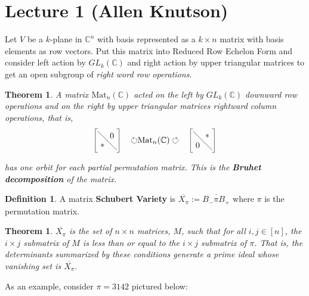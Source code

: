 \documentclass[12pt]{amsart}
\numberwithin{equation}{section}
\newtheorem{Theorem}[equation]{Theorem}
\theoremstyle{definition}
\newtheorem{Definition}[equation]{Definition}
\numberwithin{figure}{section}
\newcommand{\C}{\mathbb{C}}
\begin{document}
\section{Lecture 1 (Allen Knutson)}

Let $V$ be a $k$-plane in $\C^n$ with basis represented as a $k\times n$ matrix with basis elements as row vectors. Put this matrix into Reduced Row Echelon Form and consider left action by $GL_k(\C)$ and right action by upper triangular matrices to get an open subgroup of \textit{right word row operations}.

\begin{Theorem}
	A matrix $\text{Mat}_n(\C)$ acted on the left by $GL_k(\C)$ downward row operations and  on the right by upper triangular matrices rightward column operations, that is,
	$$\begin{tikzpicture}
		\node (a) at (.3,.3) {$*$};
		\node (b) at (.7,.7) {$0$};
		\draw [-] (.9,.1) to (.1,.9);
		\draw[-] (0,0) to (0,1);
		\draw[-] (1,0) to (1,1);
		\draw[-] (0,0) to (.1,0);
		\draw[-] (0,1) to (.1,1);
		\draw[-] (.9,0) to (1,0);
		\draw[-] (.9,1) to (1,1);
		\node (c) at (2.5,.5) {$\circlearrowright$Mat$_n(\C)\circlearrowleft$};
		\node (a) at (4.3,.3) {$0$};
		\node (b) at (4.7,.7) {$*$};
		\draw [-] (4.9,.1) to (4.1,.9);
		\draw[-] (4,0) to (4,1);
		\draw[-] (5,0) to (5,1);
		\draw[-] (4,0) to (4.1,0);
		\draw[-] (4,1) to (4.1,1);
		\draw[-] (4.9,0) to (5,0);
		\draw[-] (4.9,1) to (5,1);
	\end{tikzpicture}$$
	has one orbit for each partial permutation matrix. This is the \textbf{Bruhet decomposition} of the matrix.
\end{Theorem}

\begin{Definition}
	A matrix \textbf{Schubert Variety} is $\overline{X_{\pi}}:=\overline{B_-\pi B_+}$ where $\pi$ is the permutation matrix.
\end{Definition}

\begin{Theorem}
	$\overline{X_\pi}$ is the set of $n\times n$ matrices, $M$, such that for all $i,j\in[n]$, the $i\times j$ submatrix of $M$ is less than or equal to the $i\times j$ submatrix of $\pi$. That is, the determinants summarized by these conditions generate a prime ideal whose vanishing set is $\overline{X_\pi}$.
\end{Theorem}

As an example, consider $\pi=3142$ pictured below:
\end{document}
